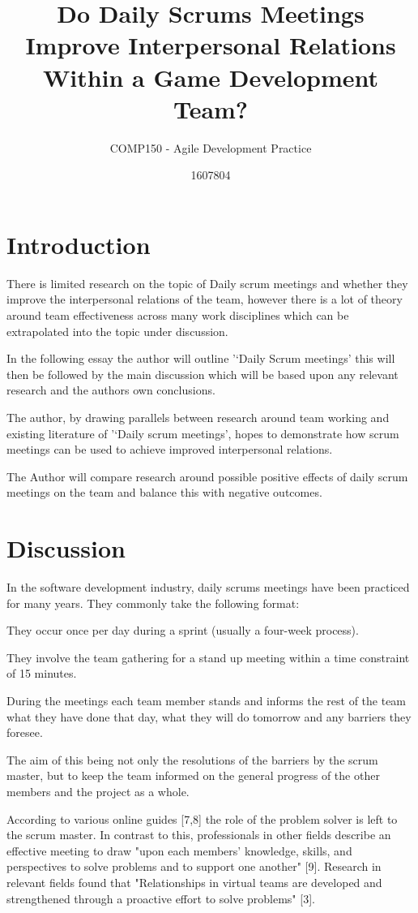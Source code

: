 \documentclass{scrartcl}
\title{Do Daily Scrums Meetings Improve Interpersonal Relations Within a Game Development Team?}
\subtitle{COMP150 - Agile Development Practice}
\author{1607804}
\begin{document}
\maketitle


\section{Introduction}
There is limited research on the topic of Daily scrum meetings and whether they improve the interpersonal relations of the team, however there is a lot of theory around team effectiveness across many work disciplines which can be extrapolated into the topic under discussion. 

In the following essay the author will outline '‘Daily Scrum meetings' this will then be followed by the main discussion which will be based upon any relevant research and the authors own conclusions. 

The author, by drawing parallels between research around team working and existing literature of '‘Daily scrum meetings', hopes to demonstrate how scrum meetings can be used to achieve improved interpersonal relations. 

The Author will compare research around possible positive effects of daily scrum meetings on the team and balance this with negative outcomes. 


\section{Discussion}
In the software development industry, daily scrums meetings have been practiced for many years. They commonly take the following format:

They occur once per day during a sprint (usually a four-week process). 

They involve the team gathering for a stand up meeting within a time constraint of 15 minutes. 

During the meetings each team member stands and informs the rest of the team what they have done that day, what they will do tomorrow and any barriers they foresee.

The aim of this being not only the resolutions of the barriers by the scrum master, but to keep the team informed on the general progress of the other members and the project as a whole. 

According to various online guides [7,8] the role of the problem solver is left to the scrum master. In contrast to this, professionals in other fields describe an effective meeting to draw "upon each members' knowledge, skills, and perspectives to solve problems and to support one another" [9]. Research in relevant fields found that "Relationships in virtual teams are developed and strengthened through a proactive effort to solve problems" [3]. 
\end{document}
